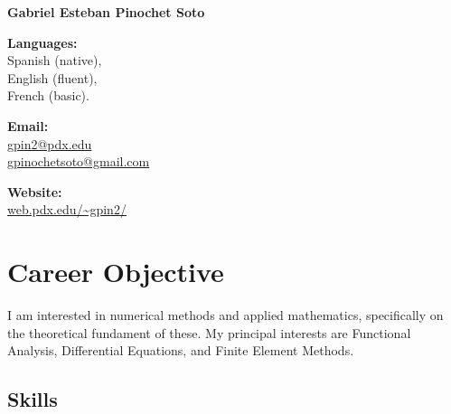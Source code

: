 \documentclass[12pt,letterpaper]{report}
\newcommand{\myname}{Gabriel Esteban Pinochet Soto}
\newcommand{\namefont}[1]{{\normalfont\bfseries\Huge{#1}}}
\begin{document}
    \raggedright{}

    \namefont{\myname}

    \vspace{1em}
    \begin{minipage}[t]{0.32\textwidth}
        {\bf Languages:}\\ Spanish (native), \\English (fluent), \\French (basic). 
    \end{minipage}
    \begin{minipage}[t]{0.32\textwidth}
        {\bf Email:}\\
        \href{mailto:gpin2@pdx.edu}{gpin2@pdx.edu}\\
        \href{mailto:gpinochetsoto@gmail.com}{gpinochetsoto@gmail.com}\\
    \end{minipage}
    \begin{minipage}[t]{0.32\textwidth}
        {\bf Website:}\\
        \href{https://web.pdx.edu/gpin2/}{web.pdx.edu/\textasciitilde{}gpin2/}
    \end{minipage}
    \hfill

    \section*{Career Objective}

    I am interested in numerical methods and applied mathematics, specifically on the theoretical fundament of these.
    My principal interests are Functional Analysis, Differential Equations, and Finite Element Methods.
	\newline  \newline\noindent	

    \subsection*{Skills}
\end{document}
